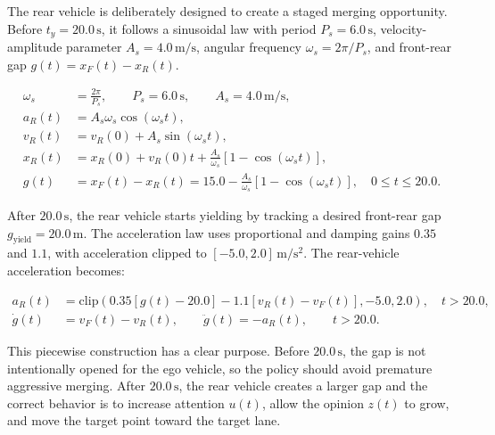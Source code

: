 The rear vehicle is deliberately designed to create a staged merging opportunity. Before \(t_y=20.0\,\mathrm{s}\), it follows a sinusoidal law with period \(P_s=6.0\,\mathrm{s}\), velocity-amplitude parameter \(A_s=4.0\,\mathrm{m/s}\), angular frequency \(\omega_s=2\pi/P_s\), and front-rear gap \(g(t)=x_F(t)-x_R(t)\).



{\small
\begin{equation}
\begin{aligned}
\omega_s&=\frac{2\pi}{P_s},\qquad P_s=6.0\,\mathrm{s},\qquad A_s=4.0\,\mathrm{m/s},\\
a_R(t)&=A_s\omega_s\cos(\omega_s t),\\
v_R(t)&=v_R(0)+A_s\sin(\omega_s t),\\
x_R(t)&=x_R(0)+v_R(0)t+\frac{A_s}{\omega_s}\left[1-\cos(\omega_s t)\right],\\
g(t)&=x_F(t)-x_R(t)=15.0-\frac{A_s}{\omega_s}\left[1-\cos(\omega_s t)\right],\quad 0\leq t\leq20.0.
\end{aligned}
\end{equation}
}


After \(20.0\,\mathrm{s}\), the rear vehicle starts yielding by tracking a desired front-rear gap \(g_{\mathrm{yield}}=20.0\,\mathrm{m}\). The acceleration law uses proportional and damping gains \(0.35\) and \(1.1\), with acceleration clipped to \([-5.0,2.0]\,\mathrm{m/s^2}\). The rear-vehicle acceleration becomes:



{\small
\begin{equation}
\begin{aligned}
a_R(t)&=\mathrm{clip}\left(0.35\left[g(t)-20.0\right]-1.1\left[v_R(t)-v_F(t)\right],-5.0,2.0\right),\quad t>20.0,\\
\dot{g}(t)&=v_F(t)-v_R(t),\qquad \ddot{g}(t)=-a_R(t),\qquad t>20.0.
\end{aligned}
\end{equation}
}


This piecewise construction has a clear purpose. Before \(20.0\,\mathrm{s}\), the gap is not intentionally opened for the ego vehicle, so the policy should avoid premature aggressive merging. After \(20.0\,\mathrm{s}\), the rear vehicle creates a larger gap and the correct behavior is to increase attention \(u(t)\), allow the opinion \(z(t)\) to grow, and move the target point toward the target lane.





